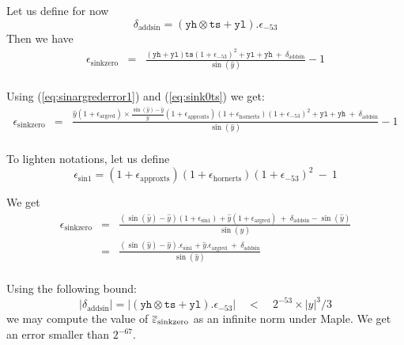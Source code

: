 Let us define for now 
\begin{equation}
  \delta_{\mathrm{addsin}} = (\mathtt{yh}\otimes\mathtt{ts} + \mathtt{yl}).\epsilon_{-53} 
\label{eq:addsin}
\end{equation}
Then we have
\begin{eqnarray*}
  \epsilon_{\mathrm{sinkzero}} 
  &=& \frac{(\mathtt{yh} + \mathtt{yl})\mathtt{ts}(1+\epsilon_{-53})^2 + \mathtt{yl} + \mathtt{yh}    \ +\  \delta_{\mathrm{addsin}} }{\sin(\hat{y})} -1\\
\end{eqnarray*}

Using (\ref{eq:sinargrederror1}) and (\ref{eq:sink0ts}) we get:
\begin{eqnarray*}
  \epsilon_{\mathrm{sinkzero}} 
  &=& \frac{\hat{y}(1+\epsilon_{\mathrm{argred}})\times\frac{\sin(\hat{y})-\hat{y}}{\hat{y}}(1+\epsilon_{\mathrm{approxts}})(1+\epsilon_{\mathrm{hornerts}})(1+\epsilon_{-53})^2 + \mathtt{yl} + \mathtt{yh}    \ +\  \delta_{\mathrm{addsin}} }{\sin(\hat{y})} -1\\
\end{eqnarray*}

To lighten notations, let us define 
\begin{equation}
 \epsilon_{\mathrm{sin1}} = (1+\epsilon_{\mathrm{approxts}})(1+\epsilon_{\mathrm{hornerts}})(1+\epsilon_{-53})^2 \ -\ 1
  \label{eq:epssin1}
\end{equation}

We get
\begin{eqnarray*}
  \epsilon_{\mathrm{sinkzero}} 
  &=& \frac{(\sin(\hat{y})-\hat{y})(1+\epsilon_{\mathrm{sin1}}) + \hat{y}(1+\epsilon_{\mathrm{argred}})    \ +\   \delta_{\mathrm{addsin}} - \sin(\hat{y})}{\sin(\hat{y})}\\
  &=& \frac{(\sin(\hat{y})-\hat{y}).\epsilon_{\mathrm{sin1}} + \hat{y}.\epsilon_{\mathrm{argred}}    \ +\ \delta_{\mathrm{addsin}}}{\sin(\hat{y})}\\
\label{eq:sinkzero}
\end{eqnarray*}

Using the following bound:
\begin{equation}
  |\delta_{\mathrm{addsin}}| = |(\mathtt{yh}\otimes\mathtt{ts} + \mathtt{yl}).\epsilon_{-53}| \quad < \quad 2^{-53}\times |y|^3/3 
\end{equation}
 we may compute the value of ${\overline{\varepsilon}}_{\mathrm{sinkzero}}$ as an
infinite norm under Maple. We get an error smaller than $2^{-67}.$ 



